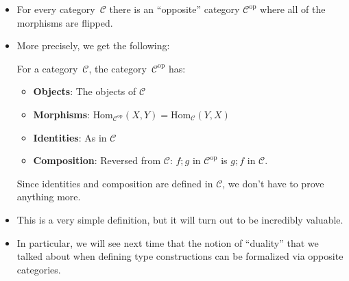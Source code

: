 \documentclass{lecturenotes}
\renewcommand{\hom}[3][]{\ensuremath{\text{Hom}_{#1}(#2, #3)}}
\newcommand{\op}[1]{\ensuremath{{#1}^{\text{op}}}}
\begin{document}
\begin{itemize}
\item For every category~$\mathcal{C}$ there is an ``opposite'' category $\op{\mathcal{C}}$ where all of the morphisms are flipped.
\item More precisely, we get the following:
  \begin{defn}
    For a category~$\mathcal{C}$, the category~$\op{\mathcal{C}}$ has:
    \begin{itemize}
    \item \textbf{Objects}: The objects of $\mathcal{C}$
    \item \textbf{Morphisms}: $\hom[\op{\mathcal{C}}]{X}{Y} = \hom[\mathcal{C}]{Y}{X}$
    \item \textbf{Identities}: As in $\mathcal{C}$
    \item \textbf{Composition}: Reversed from $\mathcal{C}$: $f;g$ in $\op{\mathcal{C}}$ is $g; f$ in $\mathcal{C}$.
    \end{itemize}
    Since identities and composition are defined in $\mathcal{C}$, we don't have to prove anything more.
  \end{defn}
\item This is a very simple definition, but it will turn out to be incredibly valuable.
\item In particular, we will see next time that the notion of ``duality'' that we talked about when defining type constructions can be formalized via opposite categories.
\end{itemize}
\end{document}
